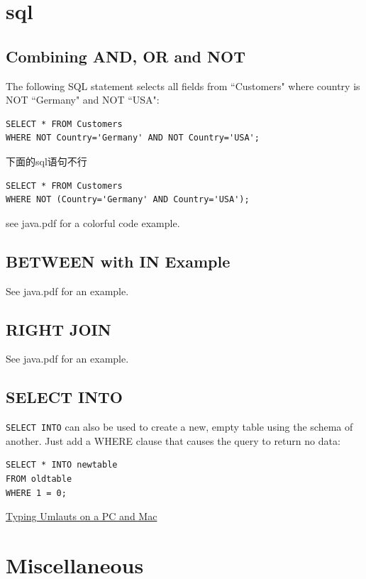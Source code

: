 \documentclass[a4paper, 12pt]{article}
\begin{document}
\section{sql}
\subsection{Combining AND, OR and NOT}
The following SQL statement selects all fields from ``Customers" where country is NOT ``Germany" and NOT ``USA":
\begin{verbatim}
SELECT * FROM Customers
WHERE NOT Country='Germany' AND NOT Country='USA';
\end{verbatim}

下面的sql语句不行
\begin{verbatim}
SELECT * FROM Customers 
WHERE NOT (Country='Germany' AND Country='USA');
\end{verbatim}

see java.pdf for a colorful code example.

\subsection{BETWEEN with IN Example}
See java.pdf for an example.

\subsection{RIGHT JOIN}
See java.pdf for an example.

\subsection{SELECT INTO}
\verb|SELECT INTO| can also be used to create a new, empty table using the schema of another. Just add a WHERE clause that causes the query to return no data:
\begin{verbatim}
SELECT * INTO newtable
FROM oldtable
WHERE 1 = 0;
\end{verbatim}



\href{http://www.nthuleen.com/teach/misc/typingumlauts.html}{Typing Umlauts on a PC and Mac}


\section{Miscellaneous}
\end{document}
